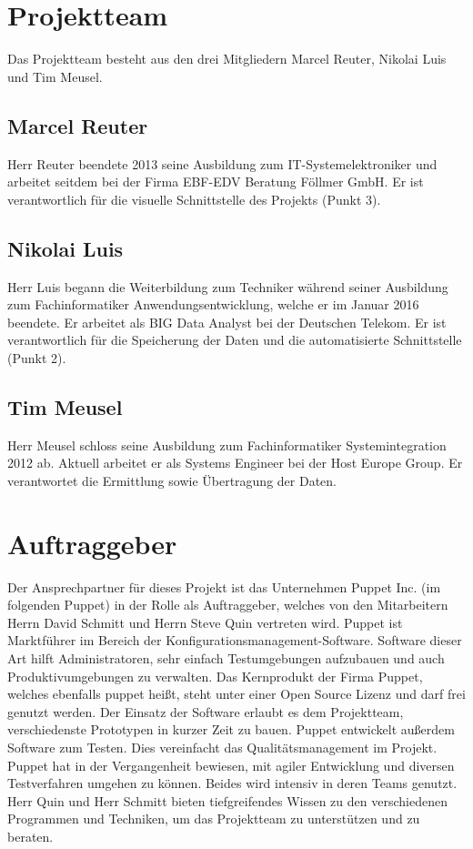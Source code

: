 \section{Projektteam}
Das Projektteam besteht aus den drei Mitgliedern Marcel Reuter, Nikolai Luis
und Tim Meusel.
\all%

\subsection{Marcel Reuter}
Herr Reuter beendete 2013 seine Ausbildung zum IT-Systemelektroniker und
arbeitet seitdem bei der Firma EBF-EDV Beratung Föllmer GmbH. Er ist
verantwortlich für die visuelle Schnittstelle des Projekts (Punkt 3).
\mr%

\subsection{Nikolai Luis}
Herr Luis begann die Weiterbildung zum Techniker während seiner Ausbildung zum
Fachinformatiker Anwendungsentwicklung, welche er im Januar 2016 beendete. Er
arbeitet als BIG Data Analyst bei der Deutschen Telekom. Er ist verantwortlich
für die Speicherung der Daten und die automatisierte Schnittstelle (Punkt 2).
\nl%

\subsection{Tim Meusel}
Herr Meusel schloss seine Ausbildung zum Fachinformatiker Systemintegration
2012 ab. Aktuell arbeitet er als Systems Engineer bei der Host Europe Group.
Er verantwortet die Ermittlung sowie Übertragung der Daten.
\tm%

\section{Auftraggeber}
Der Ansprechpartner für dieses Projekt ist das Unternehmen Puppet Inc. (im
folgenden Puppet) in der Rolle als Auftraggeber, welches von den Mitarbeitern
Herrn David Schmitt und Herrn Steve Quin vertreten wird. Puppet ist Marktführer
im Bereich der Konfigurationsmanagement-Software. Software dieser Art hilft
Administratoren, sehr einfach Testumgebungen aufzubauen und auch
Produktivumgebungen zu verwalten. Das Kernprodukt der Firma Puppet, welches
ebenfalls puppet heißt, steht unter einer Open Source Lizenz und darf frei
genutzt werden. Der Einsatz der Software erlaubt es dem Projektteam,
verschiedenste Prototypen in kurzer Zeit zu bauen. Puppet entwickelt außerdem
Software zum Testen. Dies vereinfacht das Qualitätsmanagement im Projekt.
Puppet hat in der Vergangenheit bewiesen, mit agiler Entwicklung und diversen
Testverfahren umgehen zu können. Beides wird intensiv in deren Teams genutzt.
Herr Quin und Herr Schmitt bieten tiefgreifendes Wissen zu den verschiedenen
Programmen und Techniken, um das Projektteam zu unterstützen und zu beraten.
\all%

